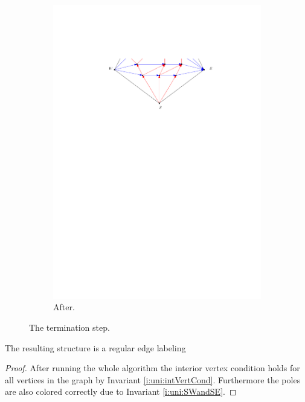 \begin{figure}[h]
\begin{subfigure}[b]{0.45 \textwidth}
        \includegraphics[width =\textwidth]{unifiedAlgo/img/sweep/terminateAfter.pdf}
        \caption{After.}
    \end{subfigure}
    \caption{The termination step.}
    \label{fig:sweep:terminate}
  \end{figure}

  \begin{lemma}
    \label{lm:sweep:REL}
    The resulting structure is a regular edge labeling
  \end{lemma}

  \begin{proof}
    After running the whole algorithm the interior vertex condition holds for all vertices in the graph by Invariant \ref{i:uni:intVertCond}. Furthermore the poles are also colored correctly due to Invariant \ref{i:uni:SWandSE}.
  \end{proof}


